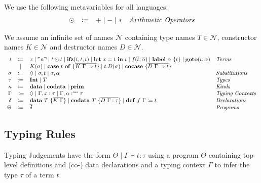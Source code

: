 \begin{definition}
  We use the following metavariables for all languages:
  \[
    \begin{array}{rcll}
      \odot  & \coloneqq & + \mid - \mid * & \emph{Arithmetic Operators}
    \end{array}
  \]
\end{definition}

\begin{definition}
  We assume an infinite set of names $\mathcal{N}$ containing type names $T\in\mathcal{N}$, constructor names $K\in\mathcal{N}$ and destructor names $D\in\mathcal{N}$.
  \[ 
    \begin{array}{r c l l}
      t & \coloneqq & x \mid \lit{n} \mid t \odot t \mid \ifz{t}{t}{t} \mid \letin{x}{t}{t} \mid f(\overline{t}; \overline{\alpha}) \mid \lab{\alpha}{t} \mid \goto{t}{\alpha} & \emph{Terms}\\
      & \mid & K(\sigma) \mid \caseof{t}{\overline{K\ \Gamma \Rightarrow t}} \mid t.D(\sigma) \mid \cocase{\overline{D\ \Gamma \Rightarrow t}} & \\
      \sigma & \coloneqq & \nil \mid \sigma,t \mid \sigma, \alpha & \emph{Substitutions}\\
      \tau & \coloneqq & \tyint \mid T & \emph{Types} \\
      \kappa & \coloneq & \mathbf{data} \mid \mathbf{codata} \mid \mathbf{prim} & \emph{Kinds} \\
      \Gamma & \Coloneqq & \nil \mid \Gamma, x : \tau \mid \Gamma, \alpha \cnt \tau & \emph{Typing Contexts} \\
      \delta & \coloneqq & \mathbf{data}\ T\ \{ \overline{K\ \Gamma} \}  \mid \mathbf{codata}\ T\ \{ \overline{D\ \Gamma : \tau}\} \mid \defi{f\ \Gamma}{t} & \emph{Declarations}\\
      \Theta & \coloneqq & \overline{\delta} & \emph{Programs}\\
    \end{array}
  \]
\end{definition}

\subsection{Typing Rules}
\label{subsec:fun:typing-rules}

Typing Judgements have the form $\Theta\mid\Gamma\vdash t:\tau$ using a program $\Theta$ containing top-level definitions and (co-) data declarations and a typing context $\Gamma$ to infer the type $\tau$ of a term $t$.\\

